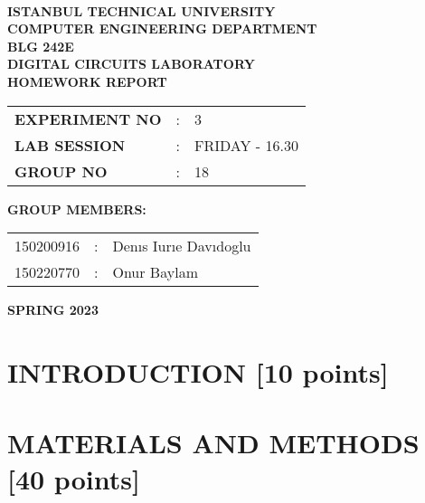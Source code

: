 \documentclass{article}
\begin{document}
\begin{titlepage}
\begin{center}
\textbf{}\\
\textbf{\Large{ISTANBUL TECHNICAL UNIVERSITY}}\\
\vspace{0.5cm}
\textbf{\Large{COMPUTER ENGINEERING DEPARTMENT}}\\
\vspace{2cm}
\textbf{\Large{BLG 242E\\ DIGITAL CIRCUITS LABORATORY\\ HOMEWORK REPORT}}\\
\vspace{2.8cm}
\begin{table}[ht]
\centering
\Large{
\begin{tabular}{lcl}
\textbf{EXPERIMENT NO}  & : & 3 \\
\textbf{LAB SESSION}  & : & FRIDAY - 16.30 \\
\textbf{GROUP NO}  & : & 18 \\
\end{tabular}}
\end{table}
\vspace{1cm}
\textbf{\Large{GROUP MEMBERS:}}\\
\begin{table}[ht]
\centering
\Large{
\begin{tabular}{rcl}
150200916  & : & Denıs Iurıe Davıdoglu \\
150220770  & : & Onur Baylam \\
\end{tabular}}
\end{table}
\vspace{2.8cm}
\textbf{\Large{SPRING 2023}}

\end{center}

\end{titlepage}
\thispagestyle{empty}
\setcounter{tocdepth}{4}
\tableofcontents
\clearpage

\setcounter{page}{1}

\section{INTRODUCTION [10 points]}
\section{MATERIALS AND METHODS [40 points]}
\end{document}
